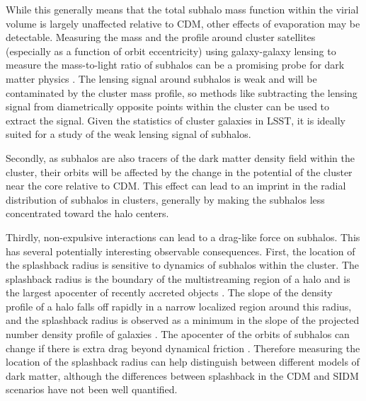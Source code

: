 While this generally means that the total subhalo mass function within the virial volume is largely unaffected relative to CDM, other effects of evaporation may be detectable. Measuring the mass and the profile around cluster satellites (especially as a function of orbit eccentricity) using galaxy-galaxy lensing to measure the mass-to-light ratio of subhalos can be a promising probe for dark matter physics \citep{Natarajan:2017sbo}. The lensing signal around subhalos is weak and will be contaminated by the cluster mass profile, so methods like subtracting the lensing signal from diametrically opposite points within the cluster can be used to extract the signal. Given the statistics of cluster galaxies in LSST, it is ideally suited for a study of the weak lensing signal of subhalos.  

Secondly, as subhalos are also tracers of the dark matter density field within the cluster, their orbits will be affected by the change in the potential of the cluster near the core relative to CDM.  This effect can lead to an imprint in the radial distribution of subhalos in clusters, generally by making the subhalos less concentrated toward the halo centers.

Thirdly, non-expulsive interactions can lead to a drag-like force on subhalos.  This has several potentially interesting observable consequences.  First, the location of the splashback radius is sensitive to dynamics of subhalos within the cluster. The splashback radius is the boundary of the multistreaming region of a halo and is the largest apocenter of recently accreted objects \citep{Diemer:2014xya,Adhikari:2014lna}. The slope of the density profile of a halo falls off rapidly in a narrow localized region around this radius, and the splashback radius is observed as a minimum in the slope of the projected number density profile of galaxies \citep{More:2016vgs,Baxter:2017csy,Chang:2017hjt}.
The apocenter of the orbits of subhalos can change if there is extra drag beyond dynamical friction \citep{Kummer2018}.  
Therefore measuring the location of the splashback radius can help distinguish between different models of dark matter, although the differences between splashback in the CDM and SIDM scenarios have not been well quantified.

